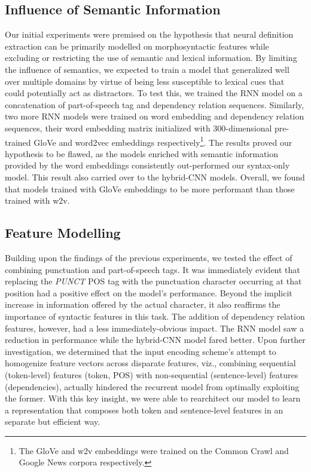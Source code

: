 \documentclass[11pt]{article}
\begin{document}
\subsection{Influence of Semantic Information}
Our initial experiments were premised on the hypothesis that neural definition extraction can be primarily modelled on
morphosyntactic features while excluding or restricting the use of semantic and lexical information. By limiting the influence
of semantics, we expected to train a model that generalized well over multiple domains by virtue of being less susceptible to
lexical cues that could potentially act as distractors. To test this, we trained the RNN model on a concatenation of
part-of-speech tag and dependency relation sequences. Similarly, two more RNN models were trained on word embedding and dependency
relation sequences, their word embedding matrix initialized with 300-dimensional pre-trained GloVe \cite{pennington2014glove} and
word2vec \cite{mikolov2013efficient} embeddings respectively\footnote{The GloVe and w2v embeddings were trained on the Common Crawl
and Google News corpora respectively.}. The results proved our hypothesis to be flawed, as the models enriched with semantic
information provided by the word embeddings consistently out-performed our syntax-only model. This result also carried over to the
hybrid-CNN models. Overall, we found that models trained with GloVe embeddings to be more performant than those trained with w2v.

\subsection{Feature Modelling}
Building upon the findings of the previous experiments, we tested the effect of combining punctuation and part-of-speech tags. It
was immediately evident that replacing the \emph{PUNCT} POS tag with the punctuation character occurring at that position had a
positive effect on the model's performance. Beyond the implicit increase in information offered by the actual character, it
also reaffirms the importance of syntactic features in this task. The addition of dependency relation features, however, had a less
immediately-obvious impact. The RNN model saw a reduction in performance while the hybrid-CNN model fared better. Upon further
investigation, we determined that the input encoding scheme's attempt to homogenize feature vectors across disparate features, viz.,
combining sequential (token-level) features (token, POS) with non-sequential (sentence-level) features (dependencies), actually
hindered the recurrent model from optimally exploiting the former. With this key insight, we were able to rearchitect our model
to learn a representation that composes both token and sentence-level features in an separate but efficient way.
\end{document}
